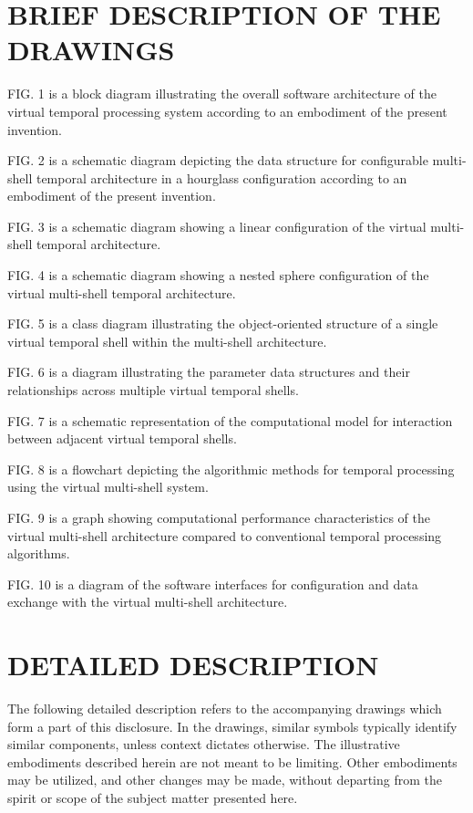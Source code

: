 \documentclass[12pt,letterpaper]{article}
\begin{document}
\section*{BRIEF DESCRIPTION OF THE DRAWINGS}

FIG. 1 is a block diagram illustrating the overall software architecture of the virtual temporal processing system according to an embodiment of the present invention.

FIG. 2 is a schematic diagram depicting the data structure for configurable multi-shell temporal architecture in a hourglass configuration according to an embodiment of the present invention.

FIG. 3 is a schematic diagram showing a linear configuration of the virtual multi-shell temporal architecture.

FIG. 4 is a schematic diagram showing a nested sphere configuration of the virtual multi-shell temporal architecture.

FIG. 5 is a class diagram illustrating the object-oriented structure of a single virtual temporal shell within the multi-shell architecture.

FIG. 6 is a diagram illustrating the parameter data structures and their relationships across multiple virtual temporal shells.

FIG. 7 is a schematic representation of the computational model for interaction between adjacent virtual temporal shells.

FIG. 8 is a flowchart depicting the algorithmic methods for temporal processing using the virtual multi-shell system.

FIG. 9 is a graph showing computational performance characteristics of the virtual multi-shell architecture compared to conventional temporal processing algorithms.

FIG. 10 is a diagram of the software interfaces for configuration and data exchange with the virtual multi-shell architecture.

\section*{DETAILED DESCRIPTION}

The following detailed description refers to the accompanying drawings which form a part of this disclosure. In the drawings, similar symbols typically identify similar components, unless context dictates otherwise. The illustrative embodiments described herein are not meant to be limiting. Other embodiments may be utilized, and other changes may be made, without departing from the spirit or scope of the subject matter presented here.
\end{document}

